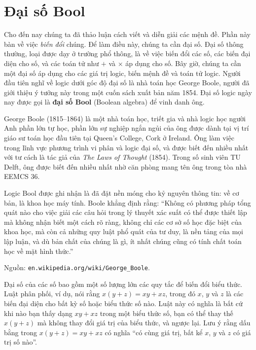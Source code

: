 \section{Đại số Bool}
\label{sec:boolean}

Cho đến nay chúng ta đã thảo luận cách viết và diễn giải các mệnh đề. Phần này bàn về việc \emph{biến đổi} chúng. Để làm điều này, chúng ta cần đại số. Đại số thông thường, loại được dạy ở trường phổ thông, là về việc biến đổi các số, các biến đại diện cho số, và các toán tử như $+$ và $\times$ áp dụng cho số. Bây giờ, chúng ta cần một đại số áp dụng cho các giá trị logic, biến mệnh đề và toán tử logic. Người đầu tiên nghĩ về logic dưới góc độ đại số là nhà toán học George Boole, người đã giới thiệu ý tưởng này trong một cuốn sách xuất bản năm 1854. Đại số logic ngày nay được gọi là \textbf{đại số Bool} (Boolean algebra) để vinh danh ông.

\begin{infobox}
George Boole (1815--1864) là một nhà toán học, triết gia và nhà logic học người Anh phần lớn tự học, phần lớn sự nghiệp ngắn ngủi của ông được dành tại vị trí giáo sư toán học đầu tiên tại Queen's College, Cork ở Ireland. Ông làm việc trong lĩnh vực phương trình vi phân và logic đại số, và được biết đến nhiều nhất với tư cách là tác giả của \emph{The Laws of Thought} (1854). Trong số sinh viên TU Delft, ông được biết đến nhiều nhất nhờ căn phòng mang tên ông trong tòa nhà EEMCS 36.

Logic Bool được ghi nhận là đã đặt nền móng cho kỷ nguyên thông tin: về cơ bản, là khoa học máy tính. Boole khẳng định rằng: ``Không có phương pháp tổng quát nào cho việc giải các câu hỏi trong lý thuyết xác suất có thể được thiết lập mà không nhận biết một cách rõ ràng, không chỉ các cơ sở số học đặc biệt của khoa học, mà còn cả những quy luật phổ quát của tư duy, là nền tảng của mọi lập luận, và dù bản chất của chúng là gì, ít nhất chúng cũng có tính chất toán học về mặt hình thức.''

Nguồn: \texttt{en.wikipedia.org/wiki/George\_Boole}.
\end{infobox}

Đại số của các số bao gồm một số lượng lớn các quy tắc để biến đổi biểu thức. Luật phân phối, ví dụ, nói rằng $x(y + z) = xy + xz$, trong đó $x$, $y$ và $z$ là các biến đại diện cho bất kỳ số hoặc biểu thức số nào. Luật này có nghĩa là bất cứ khi nào bạn thấy dạng $xy + xz$ trong một biểu thức số, bạn có thể thay thế $x(y + z)$ mà không thay đổi giá trị của biểu thức, và ngược lại. Lưu ý rằng dấu bằng trong $x(y + z) = xy + xz$ có nghĩa ``có cùng giá trị, bất kể $x$, $y$ và $z$ có giá trị số nào''.

